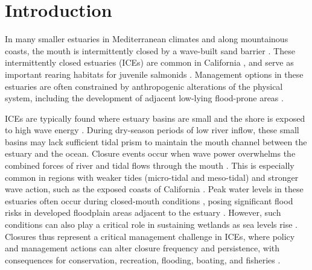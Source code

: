 \documentclass[preprint,12pt,authoryear]{elsarticle}
\begin{document}

%  

\section{Introduction}
\label{sec:intro}

In many smaller estuaries in Mediterranean climates and along mountainous coasts, the mouth is intermittently closed by a wave-built sand barrier \citep{mcsweeney2017intermittently, largier2023recognizing}. 
These intermittently closed estuaries (ICEs) are common in California 
\citep{heady2015assessing}, and serve as important rearing habitats for juvenile salmonids \citep{bond2008marine, heady2015assessing, huber2020environmental}. Management options in these estuaries are often constrained by anthropogenic alterations of the physical system, including the development of adjacent low-lying flood-prone areas \citep{largier2019considerations}.



ICEs are typically found where estuary basins are small and the shore is exposed to high wave energy \citep{cooper2001geomorphological}. During dry-season periods of low river inflow, these small basins may lack sufficient tidal prism to maintain the mouth channel between the estuary and the ocean. Closure events occur when wave power overwhelms the combined forces of river and tidal flows through the mouth \citep{behrens2013episodic, behrens2015quantified}.  This  is especially common in regions with weaker tides (micro-tidal and meso-tidal) and stronger wave action, such as the exposed coasts of California 
\citep{mcsweeney2017intermittently}. 
Peak water levels in these estuaries often occur during closed-mouth conditions \citep{booysen2020methods}, posing significant flood risks in developed floodplain areas adjacent to the estuary \citep{clark2019systematic}. However, such conditions can also play a critical role in sustaining wetlands as sea levels rise \citep{thorne2021wetlands}. Closures thus represent a critical management challenge in ICEs, where policy and management actions can alter closure frequency and persistence, with consequences for conservation, recreation, flooding, boating, and fisheries \citep{stein2021advancing}.
\end{document}
